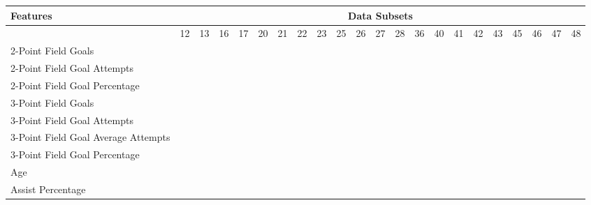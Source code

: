 \documentclass{article}
\def \cm{\checkmark}
\begin{document}

    \begin{table}[ht]
        \centering
        \large
        \begin{tabular}{lccccccccccccccccccccc}
            \LARGE{Features} & \multicolumn{21}{c}{\LARGE{Data Subsets}} \\
            \toprule
                                                & 12  & 13  & 16  & 17  & 20  & 21  & 22  & 23  & 25  & 26  & 27  & 28  & 36  & 40  & 41  & 42  & 43  & 45  & 46  & 47  & 48  \\
            \midrule
            2-Point Field Goals                 & \cm & \cm & \cm & \cm & \cm & \cm & \cm & \cm & \cm & \cm & \cm & \cm & \cm & \cm & \cm & \cm & \cm & \cm & \cm & \cm & \cm \\
            \midrule
            2-Point Field Goal Attempts         & \cm & \cm & \cm & \cm & \cm & \cm & \cm & \cm & \cm & \cm & \cm & \cm & \cm & \cm & \cm & \cm & \cm & \cm & \cm & \cm & \cm \\
            \midrule
            2-Point Field Goal Percentage       &     &     &     &     &     & \cm & \cm & \cm & \cm & \cm & \cm & \cm & \cm & \cm & \cm & \cm & \cm & \cm & \cm & \cm & \cm \\
            \midrule
            3-Point Field Goals                 &     &     &     &     &     &     &     &     &     &     &     &     &     &     &     &     &     & \cm & \cm & \cm & \cm \\
            \midrule
            3-Point Field Goal Attempts         &     &     &     &     &     &     &     &     &     &     &     &     &     &     &     &     &     & \cm & \cm & \cm & \cm \\
            \midrule
            3-Point Field Goal Average Attempts &     &     &     &     &     &     &     &     &     &     &     &     &     &     &     &     &     &     & \cm & \cm & \cm \\
            \midrule
            3-Point Field Goal Percentage       &     &     &     &     &     &     &     &     &     &     &     &     &     &     &     &     &     &     &     &     & \cm \\
            \midrule
            Age                                 &     & \cm & \cm & \cm & \cm & \cm & \cm & \cm & \cm & \cm & \cm & \cm & \cm & \cm & \cm & \cm & \cm & \cm & \cm & \cm & \cm \\
            \midrule
            Assist Percentage                   &     &     &     &     &     &     &     &     &     &     & \cm & \cm & \cm & \cm & \cm & \cm & \cm & \cm & \cm & \cm & \cm \\

\end{tabular}
\end{table}
\end{document}

